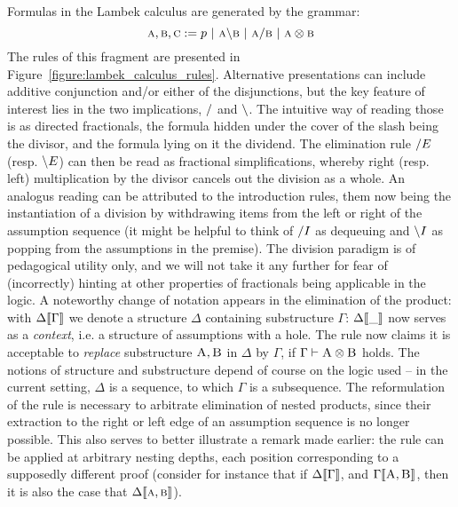 Formulas in the Lambek calculus are generated by the grammar:
\begin{equation}
\prop{a}, \prop{b}, \prop{c} := p \ | \ \prop{a} \divleft \prop{b} \ | \ \prop{a} \divright \prop{b} \ | \ \prop{a} \otimes \prop{b}
\label{equation:LC}
\end{equation}
The rules of this fragment are presented in Figure~\ref{figure:lambek_calculus_rules}.
Alternative presentations can include additive conjunction and/or either of the disjunctions, but the key feature of interest lies in the two implications, $/$ and $\backslash$.
The intuitive way of reading those is as directed fractionals, the formula hidden under the cover of the slash being the divisor, and the formula lying on it the dividend.
The elimination rule $/ E$ (resp. $\backslash E$) can then be read as fractional simplifications, whereby right (resp. left) multiplication by the divisor cancels out the division as a whole.
An analogus reading can be attributed to the introduction rules, them now being the instantiation of a division by withdrawing items from the left or right of the assumption sequence (it might be helpful to think of $/ I$ as dequeuing and $\backslash I$ as popping from the assumptions in the premise).
The division paradigm is of pedagogical utility only, and we will not take it any further for fear of (incorrectly) hinting at other properties of fractionals being applicable in the logic.
A noteworthy change of notation appears in the elimination of the product: with $\Delta\llbracket{\Gamma}\rrbracket$ we denote a structure $\Delta$ containing substructure $\Gamma$: $\Delta\llbracket{\_}\rrbracket$ now serves as a \textit{context}, i.e. a structure of assumptions with a hole.
The rule now claims it is acceptable to \textit{replace} substructure $\normalfont\textsc{A}, \normalfont\textsc{B}$ in $\Delta$ by $\Gamma$, if $\Gamma \vdash \normalfont\textsc{A}\otimes\normalfont\textsc{B}$ holds.
The notions of structure and substructure depend of course on the logic used -- in the current setting, $\Delta$ is a sequence, to which $\Gamma$ is a subsequence. 
The reformulation of the rule is necessary to arbitrate elimination of nested products, since their extraction to the right or left edge of an assumption sequence is no longer possible.
This also serves to better illustrate a remark made earlier: the rule can be applied at arbitrary nesting depths, each position corresponding to a supposedly different proof (consider for instance that if $\Delta\llbracket{\Gamma}\rrbracket$, and $\Gamma\llbracket{ \ensuremath{\normalfont\textsc{A}},  \ensuremath{\normalfont\textsc{B}}}\rrbracket$, then it is also the case that $\Delta\ctx{\prop{a}, \prop{b}}$).

